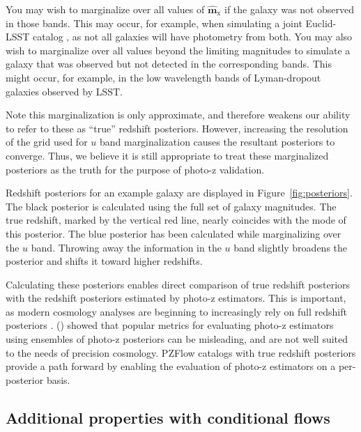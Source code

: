 \documentclass[twocolumn,twocolappendix]{aastex631}
\newcommand{\citePZt}{\citetalias{schmidt2020} (\citeyear{schmidt2020})\xspace}
\begin{document}
You may wish to marginalize over all values of $\mathbf{\hat{m}}_\text{x}$ if the galaxy was not observed in those bands.
This may occur, for example, when simulating a joint Euclid-LSST catalog \citep{euclid}, as not all galaxies will have photometry from both.
You may also wish to marginalize over all values beyond the limiting magnitudes to simulate a galaxy that was observed but not detected in the corresponding bands.
This might occur, for example, in the low wavelength bands of Lyman-dropout galaxies observed by LSST.

Note this marginalization is only approximate, and therefore weakens our ability to refer to these as ``true'' redshift posteriors.
However, increasing the resolution of the grid used for $u$ band marginalization causes the resultant posteriors to converge.
Thus, we believe it is still appropriate to treat these marginalized posteriors as the truth for the purpose of photo-z validation.

Redshift posteriors for an example galaxy are displayed in Figure~\ref{fig:posteriors}.
The black posterior is calculated using the full set of galaxy magnitudes.
The true redshift, marked by the vertical red line, nearly coincides with the mode of this posterior.
The blue posterior has been calculated while marginalizing over the $u$ band.
Throwing away the information in the $u$ band slightly broadens the posterior and shifts it toward higher redshifts.

Calculating these posteriors enables direct comparison of true redshift posteriors with the redshift posteriors estimated by photo-z estimators.
This is important, as modern cosmology analyses are beginning to increasingly rely on full redshift posteriors \citep{mandelbaum2008,newman2022}.
\citePZt showed that popular metrics for evaluating photo-z estimators using ensembles of photo-z posteriors can be misleading, and are not well suited to the needs of precision cosmology.
PZFlow catalogs with true redshift posteriors provide a path forward by enabling the evaluation of photo-z estimators on a per-posterior basis.


\subsection{Additional properties with conditional flows}
\label{sec:fwd-model-conditional}
\end{document}

